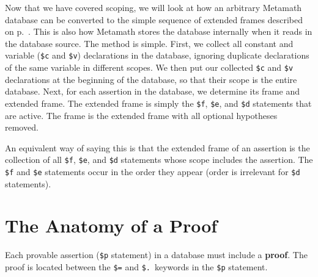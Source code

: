 Now that we have covered scoping, we will look at how an arbitrary
Metamath database can be converted to the simple sequence of extended
frames described on p.~\pageref{framelist}.  This is also how Metamath
stores the database internally when it reads in the database
source.\label{frameconvert} The method is simple.  First, we collect all
constant and variable (\texttt{\$c} and \texttt{\$v}) declarations in
the database, ignoring duplicate declarations of the same variable in
different scopes.  We then put our collected \texttt{\$c} and
\texttt{\$v} declarations at the beginning of the database, so that
their scope is the entire database.  Next, for each assertion in the
database, we determine its frame and extended frame.  The extended frame
is simply the \texttt{\$f}, \texttt{\$e}, and \texttt{\$d} statements
that are active.  The frame is the extended frame with all optional
hypotheses removed.

An equivalent way of saying this is that the extended frame of an assertion
is the collection of all \texttt{\$f}, \texttt{\$e}, and \texttt{\$d} statements
whose scope includes the assertion.
The \texttt{\$f} and \texttt{\$e} statements
occur in the order they appear
(order is irrelevant for \texttt{\$d} statements).


\section{The Anatomy of a Proof} \label{proof}

Each provable assertion (\texttt{\$p} statement) in a
database must include a {\bf proof}.  The proof is located
between the \texttt{\$=} and \texttt{\$.}\ keywords in the
\texttt{\$p} statement.


